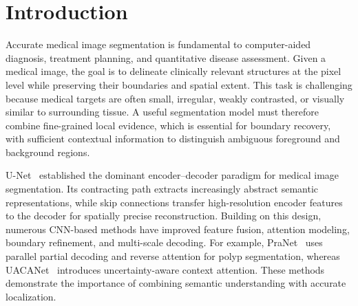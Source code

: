 








\section{Introduction}

Accurate medical image segmentation is fundamental to computer-aided diagnosis, treatment planning, and quantitative disease assessment. Given a medical image, the goal is to delineate clinically relevant structures at the pixel level while preserving their boundaries and spatial extent. This task is challenging because medical targets are often small, irregular, weakly contrasted, or visually similar to surrounding tissue. A useful segmentation model must therefore combine fine-grained local evidence, which is essential for boundary recovery, with sufficient contextual information to distinguish ambiguous foreground and background regions.

U-Net~\cite{ronneberger2015unet} established the dominant encoder--decoder paradigm for medical image segmentation. Its contracting path extracts increasingly abstract semantic representations, while skip connections transfer high-resolution encoder features to the decoder for spatially precise reconstruction. Building on this design, numerous CNN-based methods have improved feature fusion, attention modeling, boundary refinement, and multi-scale decoding. For example, PraNet~\cite{fan2020pranet} uses parallel partial decoding and reverse attention for polyp segmentation, whereas UACANet~\cite{kim2021uacanet} introduces uncertainty-aware context attention. These methods demonstrate the importance of combining semantic understanding with accurate localization.

